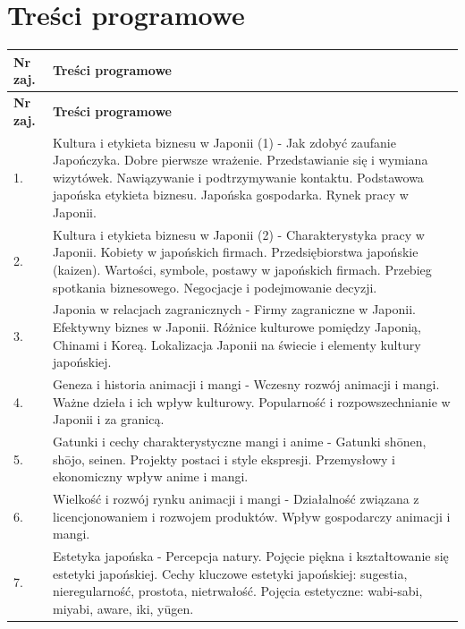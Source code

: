 \documentclass[12pt, a4paper]{article}
\newcommand{\thdrule}{\noalign{\global\setlength{\extrarowheight}{0pt}}}
\newcommand{\thdend}{\noalign{\global\setlength{\extrarowheight}{3pt}}}
\begin{document}
\section{Treści programowe}

{\scriptsize
\begin{longtable}{m{1.5cm}m{14.5cm}}
\thdrule\toprule
\rowcolor{pjatkRed} {\color{white}\textbf{Nr zaj.}} & {\color{white}\textbf{Treści programowe}} \\
\midrule\thdend
\endfirsthead
\thdrule\toprule
\rowcolor{pjatkRed} {\color{white}\textbf{Nr zaj.}} & {\color{white}\textbf{Treści programowe}} \\
\midrule\thdend
\endhead
  \rowcolor{tableRowLight} 1. & Kultura i etykieta biznesu w Japonii (1) - Jak zdobyć zaufanie Japończyka. Dobre pierwsze wrażenie. Przedstawianie się i wymiana wizytówek. Nawiązywanie i podtrzymywanie kontaktu. Podstawowa japońska etykieta biznesu. Japońska gospodarka. Rynek pracy w Japonii. \\
  \rowcolor{tableRowAlt} 2. & Kultura i etykieta biznesu w Japonii (2) - Charakterystyka pracy w Japonii. Kobiety w japońskich firmach. Przedsiębiorstwa japońskie (kaizen). Wartości, symbole, postawy w japońskich firmach. Przebieg spotkania biznesowego. Negocjacje i podejmowanie decyzji. \\
  \rowcolor{tableRowLight} 3. & Japonia w relacjach zagranicznych - Firmy zagraniczne w Japonii. Efektywny biznes w Japonii. Różnice kulturowe pomiędzy Japonią, Chinami i Koreą. Lokalizacja Japonii na świecie i elementy kultury japońskiej. \\
  \rowcolor{tableRowAlt} 4. & Geneza i historia animacji i mangi - Wczesny rozwój animacji i mangi. Ważne dzieła i ich wpływ kulturowy. Popularność i rozpowszechnianie w Japonii i za granicą. \\
  \rowcolor{tableRowLight} 5. & Gatunki i cechy charakterystyczne mangi i anime - Gatunki shōnen, shōjo, seinen. Projekty postaci i style ekspresji. Przemysłowy i ekonomiczny wpływ anime i mangi. \\
  \rowcolor{tableRowAlt} 6. & Wielkość i rozwój rynku animacji i mangi - Działalność związana z licencjonowaniem i rozwojem produktów. Wpływ gospodarczy animacji i mangi. \\
  \rowcolor{tableRowLight} 7. & Estetyka japońska - Percepcja natury. Pojęcie piękna i kształtowanie się estetyki japońskiej. Cechy kluczowe estetyki japońskiej: sugestia, nieregularność, prostota, nietrwałość. Pojęcia estetyczne: wabi-sabi, miyabi, aware, iki, yūgen. \\

\end{longtable}}
\end{document}
